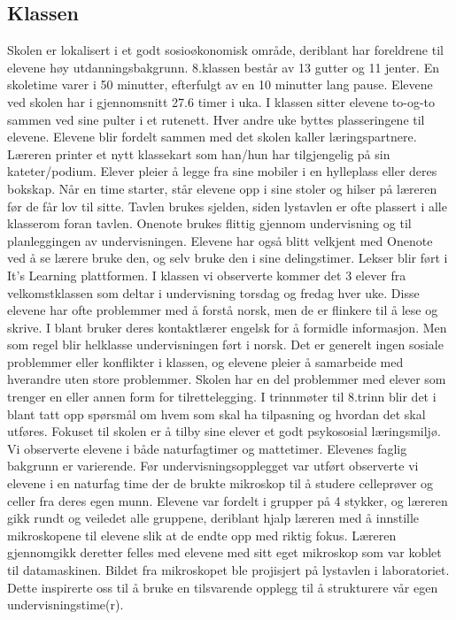 \documentclass[main.tex]{subfiles}
\begin{document}
\subsection*{Klassen}
Skolen er lokalisert i et godt sosioøkonomisk område, deriblant har foreldrene til elevene høy utdanningsbakgrunn. 8.klassen består av 13 gutter og 11 jenter. En skoletime varer i 50 minutter, efterfulgt av en 10 minutter lang pause. Elevene ved skolen har i gjennomsnitt 27.6 timer i uka. I klassen sitter elevene to-og-to sammen ved sine pulter i et rutenett. Hver andre uke byttes plasseringene til elevene. Elevene blir fordelt sammen med det skolen kaller læringspartnere. Læreren printer et nytt klassekart som han/hun har tilgjengelig på sin kateter/podium. Elever pleier å legge fra sine mobiler i en hylleplass eller deres bokskap. Når en time starter, står elevene opp i sine stoler og hilser på læreren før de får lov til sitte. Tavlen brukes sjelden, siden lystavlen er ofte plassert i alle klasserom foran tavlen. Onenote brukes flittig gjennom undervisning og til planleggingen av undervisningen. Elevene har også blitt velkjent med Onenote ved å se lærere bruke den, og selv bruke den i sine delingstimer. Lekser blir ført i It’s Learning plattformen. I klassen vi observerte kommer det 3 elever fra velkomstklassen som deltar i undervisning torsdag og fredag hver uke. Disse elevene har ofte problemmer med å forstå norsk, men de er flinkere til å lese og skrive. I blant bruker deres kontaktlærer engelsk for å formidle informasjon. Men som regel blir helklasse undervisningen ført i norsk. Det er generelt ingen sosiale problemmer eller konflikter i klassen, og elevene pleier å samarbeide med hverandre uten store problemmer. Skolen har en del problemmer med elever som trenger en eller annen form for tilrettelegging. I trinnmøter til 8.trinn blir det i blant tatt opp spørsmål om hvem som skal ha tilpasning og hvordan det skal utføres. Fokuset til skolen er å tilby sine elever et godt psykososial læringsmiljø.
\newline
Vi observerte elevene i både naturfagtimer og mattetimer. Elevenes faglig bakgrunn er varierende. Før 
undervisningsopplegget var utført observerte vi elevene i en naturfag time der de brukte mikroskop til å studere 
celleprøver og celler fra deres egen munn. Elevene var fordelt i grupper på 4 stykker, og læreren gikk rundt og 
veiledet alle gruppene, deriblant hjalp læreren med å innstille mikroskopene til elevene slik at de endte opp med
riktig fokus. Læreren gjennomgikk deretter felles med elevene med sitt eget mikroskop
som var koblet til datamaskinen. Bildet fra mikroskopet ble projisjert på lystavlen i laboratoriet. Dette inspirerte 
oss til å bruke en tilsvarende opplegg til å strukturere vår egen undervisningstime(r).
\end{document}
